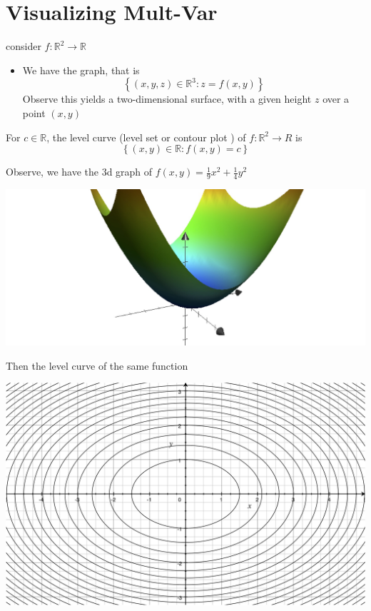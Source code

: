 \documentclass[11pt]{book}
\begin{document}

\section{Visualizing Mult-Var}%
\label{sec:visualizing_mult_var}

consider $f : \mathbb{R} ^2  \to \mathbb{R}  $ 
\begin{itemize}
    \item We have the graph, that is 
        \[
            \left\{ \left( x,y, z \right) \in  \mathbb{R} ^{3} : z= f\left(x, y\right)  \right\}    
        \]
        Observe this yields a two-dimensional surface, with a given height $z$ over a point $\left( x,y \right) $ 
\end{itemize}

\begin{defn}\label{defn:level_curve}
    For $c \in  \mathbb{R} $,  the level curve (level set or contour plot ) of $f : \mathbb{R} ^2  \to R $ is 
    \[
        \left\{ \left( x, y \right) \in \mathbb{R} : f\left(x,y\right) = c \right\} 
    \]
\end{defn}

Observe, we have the 3d graph of $f\left(x, y\right) = \frac{1}{9}x^2  + \frac{1}{4}y^2 $  

\begin{center}
    \includegraphics[width=0.7\columnwidth]{assets/3d-graph.jpg}
\end{center}

Then the level curve of the same function 

\begin{center}
    \includegraphics[width=0.7\columnwidth]{assets/level-c.jpg} 
\end{center}
\end{document}
